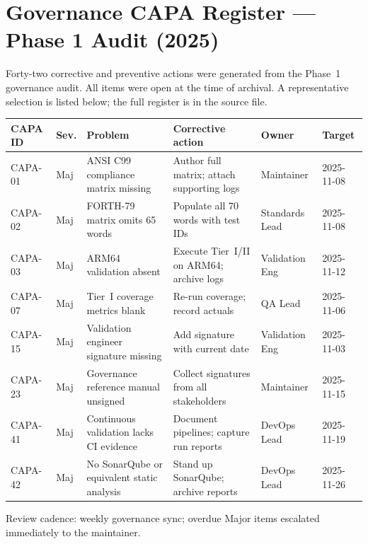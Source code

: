 
\section{Governance CAPA Register --- Phase 1 Audit (2025)}

Forty-two corrective and preventive actions were generated from the Phase~1 governance
audit. All items were open at the time of archival. A representative selection is
listed below; the full register is in the source file.

\begin{center}
\begin{tabular}{p{1.5cm}p{1cm}p{4cm}p{4cm}p{2cm}p{1.5cm}}
\toprule
CAPA ID & Sev. & Problem & Corrective action & Owner & Target \\
\midrule
CAPA-01 & Maj & ANSI C99 compliance matrix missing &
  Author full matrix; attach supporting logs &
  Maintainer & 2025-11-08 \\
CAPA-02 & Maj & FORTH-79 matrix omits 65 words &
  Populate all 70 words with test IDs &
  Standards Lead & 2025-11-08 \\
CAPA-03 & Maj & ARM64 validation absent &
  Execute Tier~I/II on ARM64; archive logs &
  Validation Eng & 2025-11-12 \\
CAPA-07 & Maj & Tier~I coverage metrics blank &
  Re-run coverage; record actuals &
  QA Lead & 2025-11-06 \\
CAPA-15 & Maj & Validation engineer signature missing &
  Add signature with current date &
  Validation Eng & 2025-11-03 \\
CAPA-23 & Maj & Governance reference manual unsigned &
  Collect signatures from all stakeholders &
  Maintainer & 2025-11-15 \\
CAPA-41 & Maj & Continuous validation lacks CI evidence &
  Document pipelines; capture run reports &
  DevOps Lead & 2025-11-19 \\
CAPA-42 & Maj & No SonarQube or equivalent static analysis &
  Stand up SonarQube; archive reports &
  DevOps Lead & 2025-11-26 \\
\bottomrule
\end{tabular}
\end{center}

Review cadence: weekly governance sync; overdue Major items escalated immediately to
the maintainer.

